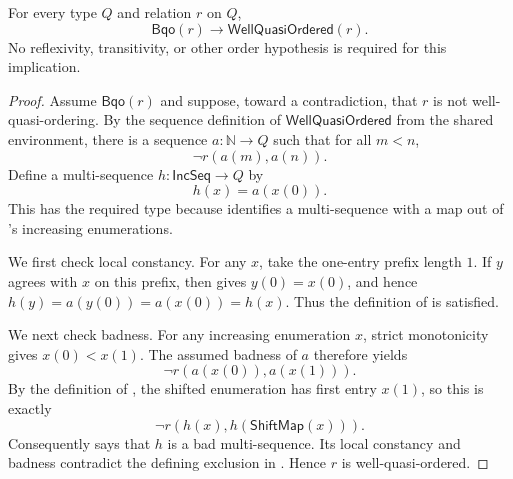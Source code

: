 \begin{lemma}
For every type $Q$ and relation $r$ on $Q$,
\[
\mathsf{Bqo}(r)\longrightarrow \mathsf{WellQuasiOrdered}(r).
\]
No reflexivity, transitivity, or other order hypothesis is required for this
implication.
\end{lemma}
\begin{proof}
Assume $\mathsf{Bqo}(r)$ and suppose, toward a contradiction, that
$r$ is not well-quasi-ordering.  By the sequence definition of
$\mathsf{WellQuasiOrdered}$ from the shared environment, there is a sequence
$a:\mathbb N\to Q$ such that for all $m<n$,
\[
\neg r(a(m),a(n)).
\]
Define a multi-sequence $h:\mathsf{IncSeq}\to Q$ by
\[
h(x)=a(x(0)).
\]
This has the required type because  identifies a
multi-sequence with a map out of 's increasing
enumerations.

We first check local constancy.  For any $x$, take the one-entry prefix
length $1$.  If $y$ agrees with $x$ on this prefix, then
 gives $y(0)=x(0)$, and hence
$h(y)=a(y(0))=a(x(0))=h(x)$.  Thus the definition of
 is satisfied.

We next check badness.  For any increasing enumeration $x$, strict
monotonicity gives $x(0)<x(1)$.  The assumed badness of $a$ therefore yields
\[
\neg r(a(x(0)),a(x(1))).
\]
By the definition of , the shifted enumeration has first
entry $x(1)$, so this is exactly
\[
\neg r(h(x),h(\mathsf{ShiftMap}(x))).
\]
Consequently  says that $h$ is a bad
multi-sequence.  Its local constancy and badness contradict the defining
exclusion in .  Hence $r$ is well-quasi-ordered.
\end{proof}
